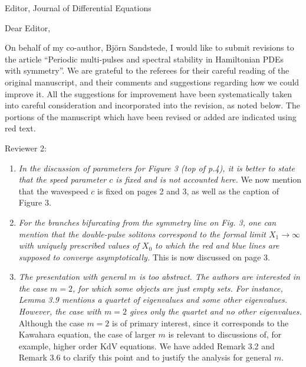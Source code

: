 \documentclass[11pt]{letter}
\begin{document}
\address{Ross Parker \\
Department of Mathematics \\
Southern Methodist University \\
Dallas, TX 75275 \\
\texttt{rhparker@smu.edu}}%
\signature{Ross Parker}
\begin{letter}{Editor, Journal of Differential Equations}

\opening{Dear Editor,}

On behalf of my co-author, Bj\"orn Sandstede, I would like to submit revisions to the article ``Periodic multi-pulses and spectral stability in Hamiltonian PDEs with symmetry''. We are grateful to the referees for their careful reading of the original manuscript, and their comments and suggestions regarding how we could improve it. All the suggestions for improvement have been systematically taken into careful consideration and incorporated into the revision, as noted below. The portions of the manuscript which have been revised or added are indicated using red text.

Reviewer 2:
\begin{enumerate}
    \item \emph{In the discussion of parameters for Figure 3 (top of p.4), it is better to state that the speed parameter $c$ is fixed and is not accounted here.} We now mention that the wavespeed $c$ is fixed on pages 2 and 3, as well as the caption of Figure 3.
    \vspace{4mm}

    \item \emph{For the branches bifurcating from the symmetry line on Fig. 3, one can mention that the double-pulse solitons correspond to the formal limit $X_1 \rightarrow \infty$ with uniquely prescribed values of $X_0$ to which the red and blue lines are supposed to converge asymptotically.} This is now discussed on page 3.
    \vspace{4mm}

    \item \emph{The presentation with general $m$ is too abstract. The authors are interested in the case $m = 2$, for which some objects are just empty sets. For instance, Lemma 3.9 mentions a quartet of eigenvalues and some other eigenvalues. However, the case with $m = 2$ gives only the quartet and no other eigenvalues.} Although the case $m=2$ is of primary interest, since it corresponds to the Kawahara equation, the case of larger $m$ is relevant to discussions of, for example, higher order KdV equations. We have added Remark 3.2 and Remark 3.6 to clarify this point and to justify the analysis for general $m$.
    \vspace{4mm}


\end{enumerate}
\end{letter}
\end{document}

